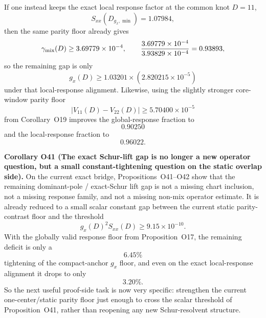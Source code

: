 \documentclass[aps,prd,onecolumn,notitlepage,nofootinbib,superscriptaddress,11pt,floatfix]{revtex4-2}
\begin{document}
If one instead keeps the exact local response factor at the common knot \(D=11\),
\[
S_{xx}(D_{g_x,\min})=1.07984,
\]
then the same parity floor already gives
\[
\gamma_{\rm mix}(D)\ge 3.69779\times10^{-4},
\qquad
\frac{3.69779\times10^{-4}}{3.93829\times10^{-4}}=0.93893,
\]
so the remaining gap is only
\[
g_x(D)\ge 1.03201\times(2.820215\times10^{-5})
\]
under that local-response alignment.  Likewise, using the slightly stronger core-window parity floor
\[
|V_{11}(D)-V_{22}(D)|\ge 5.70400\times10^{-5}
\]
from Corollary~O19 improves the global-response fraction to
\[
0.90250
\]
and the local-response fraction to
\[
0.96022.
\]

\medskip\noindent\textbf{Corollary O41 (The exact Schur-lift gap is no longer a new operator question, but a small constant-tightening question on the static overlap side).}
On the current exact bridge, Propositions~O41--O42 show that the remaining dominant-pole / exact-Schur lift gap is not a missing chart inclusion, not a missing response family, and not a missing non-mix operator estimate.  It is already reduced to a small scalar constant gap between the current static parity-contrast floor and the threshold
\[
g_x(D)^2S_{xx}(D)\ge 9.15\times10^{-10}.
\]
With the globally valid response floor from Proposition~O17, the remaining deficit is only a
\[
6.45\%
\]
tightening of the compact-anchor \(g_x\) floor, and even on the exact local-response alignment it drops to only
\[
3.20\%.
\]
So the next useful proof-side task is now very specific: strengthen the current one-center/static parity floor just enough to cross the scalar threshold of Proposition~O41, rather than reopening any new Schur-resolvent structure.
\end{document}

